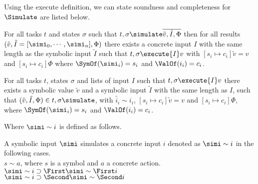 Using the execute definition, we can state soundness and completeness for $\Simulate$ are listed below.

\begin{lemma}
  \label{lem:soundsimulate}
  For all tasks $t$ and states $\sigma$
  such that $t,\sigma\simulate\overline{\tilde{v},\tilde{I},\Phi}$
  then for all results $(\tilde{v},\tilde{I}=[\simi_0,\cdots,\simi_n],\Phi)$
  there exists a concrete input $I$ with the same length as the symbolic input $\tilde{I}$
  such that $t,\sigma\execute{I}v$
  with $[s_i\mapsto c_i]\tilde{v}=v$ and $[s_i\mapsto c_i]\Phi$
  where $\SymOf(\simi_i)=s_i$ and $\ValOf(i_i)=c_i$.
\end{lemma}

\begin{lemma}
  \label{lem:completesimulate}
  For all tasks $t$, states $\sigma$ and lists of input $I$
  such that $t,\sigma\execute{I}v$
  there exists a symbolic value $\tilde{v}$ and a symbolic input $\tilde{I}$ with the same length as $I$,
  such that $(\tilde{v},\tilde{I},\Phi)\in t,\sigma\simulate$,
  with $\tilde{i_i}\sim i_i$, $[s_i\mapsto c_i]\tilde{v}=v$ and $[s_i\mapsto c_i]\Phi$,
  where $\SymOf(\simi_i)=s_i$ and $\ValOf(i_i)=c_i$.
\end{lemma}

Where $\simi\sim i$ is defined as follows.

\begin{definition}
  A symbolic input $\simi$ simulates a concrete input $i$ denoted as $\simi\sim i$ in the following cases.\\
  $s\sim a$, where $s$ is a symbol and $a$ a concrete action.\\
  $\simi\sim i\implies \First \simi \sim \First i$\\
  $\simi\sim i\implies \Second \simi \sim \Second i$
\end{definition}

